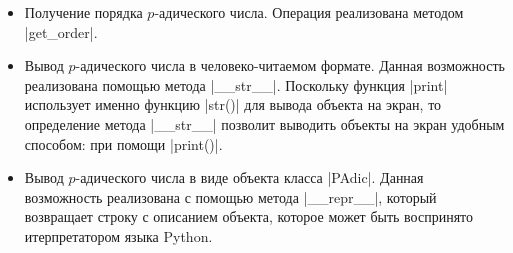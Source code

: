 \documentclass[master, och, diploma, times]{sty/SCWorks}
\theoremstyle{plain}
\theoremstyle{definition}
\begin{document}
\begin{itemize}
  \item Получение порядка $p$-адического числа. Операция реализована методом |get_order|.
  \item Вывод $p$-адического числа в человеко-читаемом формате. Данная возможность реализована  помощью метода |__str__|. Поскольку функция |print| использует именно функцию |str()| для вывода объекта на экран, то определение метода |__str__| позволит выводить объекты на экран удобным способом: при помощи |print()|.
  \item Вывод $p$-адического числа в виде объекта класса |PAdic|. Данная возможность реализована с помощью метода |__repr__|, который возвращает строку с описанием объекта, которое может быть воспринято итерпретатором языка Python.


\end{itemize}
\end{document}
